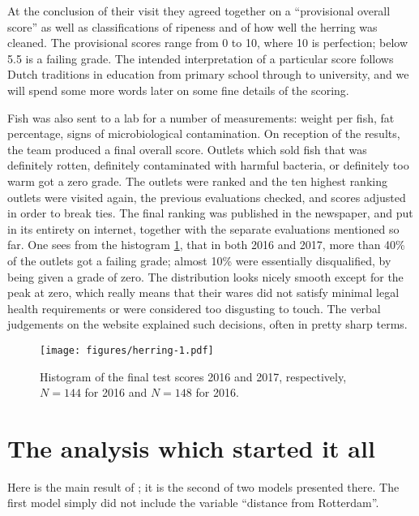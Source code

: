 \documentclass[alpha-refs]{wiley-article}
\begin{document}
At the conclusion of their visit they agreed together on a ``provisional overall score'' as well as classifications of ripeness and of how well the herring was cleaned.  The provisional scores range from 0 to 10, where 10 is perfection;  below 5.5 is a failing grade. The intended interpretation of a particular score follows Dutch traditions in education from primary school through to university, and we will spend some more words later on some fine details of the scoring.  

Fish was also sent to a lab for a number of measurements: weight per fish, fat percentage, signs of microbiological contamination. On reception of the results, the team produced a final overall score. Outlets which sold fish that was definitely rotten, definitely contaminated with harmful bacteria, or definitely too warm got a zero grade. The outlets were ranked and the ten highest ranking outlets were visited again, the previous evaluations checked, and scores adjusted in order to break ties.  The final ranking was published in the newspaper, and put in its entirety on internet, together with the separate evaluations mentioned so far. 
One sees from the histogram \cref{fig:1}, that in both 2016 and 2017, more than 40\% of the outlets got a failing grade; almost 10\% were essentially disqualified, by being given a grade of zero. The distribution looks nicely smooth except for the peak at zero, which really means that their wares did not satisfy minimal legal health requirements or were considered too disgusting to touch. The verbal judgements on the website explained such decisions, often in pretty sharp terms.


\begin{figure}[htp]
\texttt{[image: figures/herring-1.pdf]}
\caption{Histogram of the final test scores 2016 and 2017, respectively, $N=144$ for 2016 and $N=148$ for 2016.}
\label{fig:1}       %
\end{figure}




\section{The analysis which started it all}\label{vollaardPaper1Model2}

Here is the main result of  \citet{vollaard1}; it is the second of two models presented there. The first model simply did not include the variable ``distance from Rotterdam''.
\end{document}
